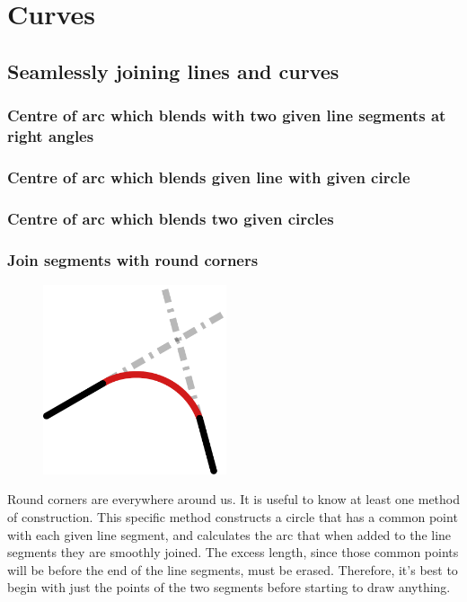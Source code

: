 \documentclass[12pt,openany,a4,usenames,dvipsnames]{book}
\begin{document}
\part{Curves}
\chapter{Seamlessly joining lines and curves}
\skelpar%
\section{Centre of arc which blends with two given line segments at right angles}
\skelpar%
\section{Centre of arc which blends given line with given circle}
\skelpar%
\section{Centre of arc which blends two given circles}
\skelpar%
\section{Join segments with round corners}\label{sec:roundcorners}
\begin{figure}
    \vspace{-60pt}
  \begin{center}
    \includegraphics[width=0.48\textwidth,keepaspectratio]{figures/fillet_main.pdf}
  \end{center}
\end{figure}
Round corners are everywhere around us. It is useful to know at least one method of construction. This specific method constructs a circle that has a common point with each given line segment, and calculates the arc that when added to the line segments they are smoothly joined. The excess length, since those common points will be before the end of the line segments, must be erased. Therefore, it's best to begin with just the points of the two segments before starting to draw anything.
\end{document}
